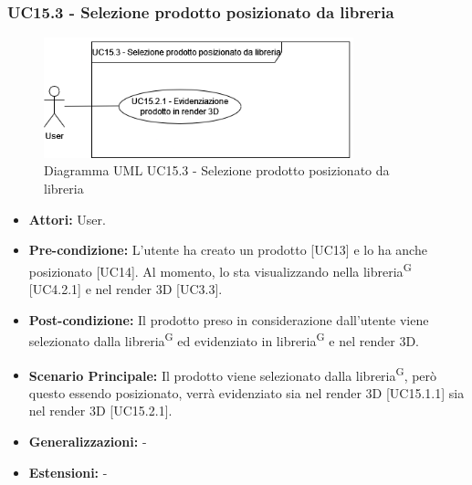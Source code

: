 \subsubsection{UC15.3 - Selezione prodotto posizionato da libreria}
\begin{figure}[H]
  \centering
  \includegraphics[width=0.8\textwidth]{UC_diagrams_11-20/UC15.3.drawio.png}
   \caption{Diagramma UML UC15.3 - Selezione prodotto posizionato da libreria}
\end{figure}
\begin{itemize}
    \item \textbf{Attori:} User.
    \item \textbf{Pre-condizione:} L'utente ha creato un prodotto [UC13] e lo ha anche posizionato [UC14]. Al momento, lo sta visualizzando nella libreria\textsuperscript{G} [UC4.2.1] e nel render 3D [UC3.3].
    \item \textbf{Post-condizione:} Il prodotto preso in considerazione dall'utente viene selezionato dalla libreria\textsuperscript{G} ed evidenziato in libreria\textsuperscript{G} e nel render 3D.
    \item \textbf{Scenario Principale:} Il prodotto viene selezionato dalla libreria\textsuperscript{G}, però questo essendo posizionato, verrà evidenziato sia nel render 3D [UC15.1.1] sia nel render 3D [UC15.2.1].
    \item \textbf{Generalizzazioni:} -
    \item \textbf{Estensioni:} -
\end{itemize}

